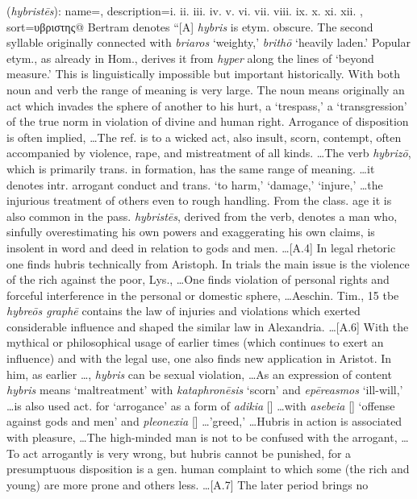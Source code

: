 \item[Hubris,]

(\textit{hybristēs}):
{
    name=,
    description={i.  ii.  iii.  iv.  v.  vi.  vii.  viii.  ix.  x.  xi.  xii. },
    sort=υβριστης@
}
Bertram denotes ``[A] \emph{hybris} is etym. obscure. The second syllable originally connected with \emph{briaros} `weighty,' \emph{brithō} `heavily laden.' Popular etym., as already in Hom., derives it from \emph{hyper} along the lines of `beyond measure.' This is linguistically impossible but important historically. With both noun and verb the range of meaning is very large. The noun means originally an act which invades the sphere of another to his hurt, a `trespass,' a `transgression' of the true norm in violation of divine and human right. Arrogance of disposition is often implied, \ldots The ref. is to a wicked act, also insult, scorn, contempt, often accompanied by violence, rape, and mistreatment of all kinds. \ldots The verb \emph{hybrizō}, which is primarily trans. in formation, has the same range of meaning. \ldots it denotes intr. arrogant conduct and trans. `to harm,' `damage,' `injure,' \ldots the injurious treatment of others even to rough handling. From the class. age it is also common in the pass. \emph{hybristēs}, derived from the verb, denotes a man who, sinfully overestimating his own powers and exaggerating his own claims, is insolent in word and deed in relation to gods and men. \ldots [A.4] In legal rhetoric one finds hubris technically from Aristoph. In trials the main issue is the violence of the rich against the poor, Lys., \ldots One finds violation of personal rights and forceful interference in the personal or domestic sphere, \ldots Aeschin. Tim., 15 tbe \emph{hybreōs graphē} contains the law of injuries and violations which exerted considerable influence and shaped the similar law in Alexandria. \ldots [A.6] With the mythical or philosophical usage of earlier times  (which continues to exert an influence) and with the legal use, one also finds new application in Aristot. In him, as earlier \ldots, \emph{hybris} can be sexual violation, \ldots As an expression of content \emph{hybris} means `maltreatment' with \emph{kataphronēsis} `scorn' and \emph{epēreasmos} `ill-will,' \ldots is also used act. for `arrogance' as a form of \emph{adikia} [] \ldots with \emph{asebeia} [] `offense against gods and men' and \emph{pleonexia} [] \ldots 'greed,' \ldots Hubris in action is associated with pleasure, \ldots The high-minded man is not to be confused with the arrogant, \ldots To act arrogantly is very wrong, but hubris cannot be punished, for a presumptuous disposition is a gen. human complaint to which some  (the rich and young) are more prone and others less. \ldots [A.7] The later period brings no 